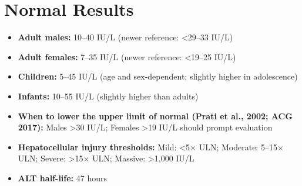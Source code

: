 \section*{Normal Results}
\begin{itemize}
  \item \textbf{Adult males:} 10--40 IU/L (newer reference: <29--33 IU/L)
  \item \textbf{Adult females:} 7--35 IU/L (newer reference: <19--25 IU/L)
  \item \textbf{Children:} 5--45 IU/L (age and sex-dependent; slightly higher in adolescence)
  \item \textbf{Infants:} 10--55 IU/L (slightly higher than adults)
  \item \textbf{When to lower the upper limit of normal (Prati et al., 2002; ACG 2017):} Males >30 IU/L; Females >19 IU/L should prompt evaluation
  \item \textbf{Hepatocellular injury thresholds:} Mild: <5$\times$ ULN; Moderate: 5--15$\times$ ULN; Severe: >15$\times$ ULN; Massive: >1,000 IU/L
  \item \textbf{ALT half-life:} 47 hours
\end{itemize}

